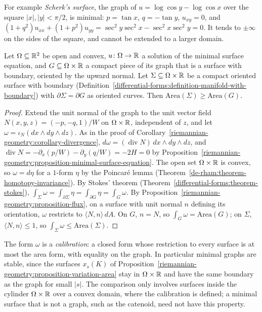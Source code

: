 For example \emph{Scherk's surface}, the graph of $u = \log\cos y - \log\cos x$ over the square $|x|, |y| < \pi/2$, is minimal: $p = \tan x$, $q = -\tan y$, $u_{xy} = 0$, and
$(1 + q^2)u_{xx} + (1 + p^2)u_{yy} = \sec^2y\sec^2x - \sec^2x\sec^2y = 0$. It tends to $\pm\infty$ on the sides of the square, and cannot be extended to a larger domain.

\begin{proposition}\label{riemannian-geometry:proposition-graphs-minimise}
Let $\Omega \subseteq \mathbb{R}^2$ be open and convex, $u \colon \Omega \to \mathbb{R}$ a solution of the minimal surface equation, and $G \subseteq \Omega \times \mathbb{R}$ a compact piece of its
graph that is a surface with boundary, oriented by the upward normal. Let $\Sigma \subseteq \Omega \times \mathbb{R}$ be a compact oriented surface with boundary
(Definition~\ref{differential-forms:definition-manifold-with-boundary}) with $\partial\Sigma = \partial G$ as oriented curves. Then $\mathrm{Area}(\Sigma) \geq \mathrm{Area}(G)$.
\end{proposition}

\begin{proof}
Extend the unit normal of the graph to the unit vector field $N(x, y, z) = (-p, -q, 1)/W$ on $\Omega \times \mathbb{R}$, independent of $z$, and let
$\omega = \iota_N(dx \wedge dy \wedge dz)$. As in the proof of Corollary~\ref{riemannian-geometry:corollary-divergence},
$d\omega = (\operatorname{div}N)\,dx \wedge dy \wedge dz$, and $\operatorname{div}N = -\partial_x(p/W) - \partial_y(q/W) = -2H = 0$ by
Proposition~\ref{riemannian-geometry:proposition-minimal-surface-equation}. The open set $\Omega \times \mathbb{R}$ is convex, so $\omega = d\eta$ for a $1$-form $\eta$ by the Poincar\'e lemma
(Theorem~\ref{de-rham:theorem-homotopy-invariance}). By Stokes' theorem (Theorem~\ref{differential-forms:theorem-stokes}),
$\int_\Sigma\omega = \int_{\partial\Sigma}\eta = \int_{\partial G}\eta = \int_G\omega$. By Proposition~\ref{riemannian-geometry:proposition-flux}, on a surface with unit normal $n$
defining its orientation, $\omega$ restricts to $\langle N, n\rangle\,dA$. On $G$, $n = N$, so $\int_G\omega = \mathrm{Area}(G)$; on $\Sigma$, $\langle N, n\rangle \leq 1$, so
$\int_\Sigma\omega \leq \mathrm{Area}(\Sigma)$.
\end{proof}

The form $\omega$ is a \emph{calibration}: a closed form whose restriction to every surface is at most the area form, with equality on the graph. In particular minimal graphs
are stable, since the surfaces $x_s(K)$ of Proposition~\ref{riemannian-geometry:proposition-variation-area} stay in $\Omega \times \mathbb{R}$ and have the same boundary as the graph for
small $|s|$. The comparison only involves surfaces inside the cylinder $\Omega \times \mathbb{R}$ over a convex domain, where the calibration is defined; a minimal surface
that is not a graph, such as the catenoid, need not have this property.

